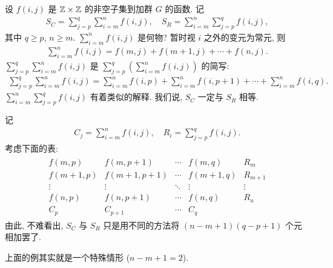 \begin{remark}
    设 $f(i,j)$ 是 $\mathbb{Z} \times \mathbb{Z}$ 的非空子集到加群 $G$ 的函数. 记
    \begin{align*}
        S_C = \sum_{j=p}^{q} \sum_{i=m}^{n} f(i,j), \quad S_R = \sum_{i=m}^{n} \sum_{j=p}^{q} f(i,j),
    \end{align*}
    其中 $q \geq p$, $n \geq m$. $\sum_{i=m}^{n} f(i,j)$ 是何物? 暂时视 $i$ 之外的变元为常元, 则
    \begin{align*}
        \sum_{i=m}^{n} f(i,j) = f(m,j) + f(m+1,j) + \cdots + f(n,j).
    \end{align*}
    $\sum_{j=p}^{q} \sum_{i=m}^{n} f(i,j)$ 是 $\sum_{j=p}^{q} \left( \sum_{i=m}^{n} f(i,j) \right)$ 的简写:
    \begin{align*}
        \sum_{j=p}^{q} \sum_{i=m}^{n} f(i,j) = \sum_{i=m}^{n} f(i,p) + \sum_{i=m}^{n} f(i,p+1) + \cdots + \sum_{i=m}^{n} f(i,q).
    \end{align*}
    $\sum_{i=m}^{n} \sum_{j=p}^{q} f(i,j)$ 有着类似的解释. 我们说, $S_C$ 一定与 $S_R$ 相等.

    记
    \begin{align*}
        C_j = \sum_{i=m}^{n} f(i,j), \quad R_i = \sum_{j=p}^{q} f(i,j).
    \end{align*}
    考虑下面的表:
    \begin{align*}
        \begin{array}{cccc|c}
            f(m,p)   & f(m,p+1)   & \cdots & f(m,q)   & R_{m}   \\
            f(m+1,p) & f(m+1,p+1) & \cdots & f(m+1,q) & R_{m+1} \\
            \vdots   & \vdots     & \ddots & \vdots   & \vdots  \\
            f(n,p)   & f(n,p+1)   & \cdots & f(n,q)   & R_{n}   \\ \hline
            C_{p}    & C_{p+1}    & \cdots & C_{q}    & \
        \end{array}
    \end{align*}
    由此, 不难看出, $S_C$ 与 $S_R$ 只是用不同的方法将 $(n-m+1)(q-p+1)$ 个元相加罢了.
\end{remark}

\begin{remark}
    上面的例其实就是一个特殊情形 ($n - m + 1 = 2$).
\end{remark}

\subsubsection*{\Rings}

